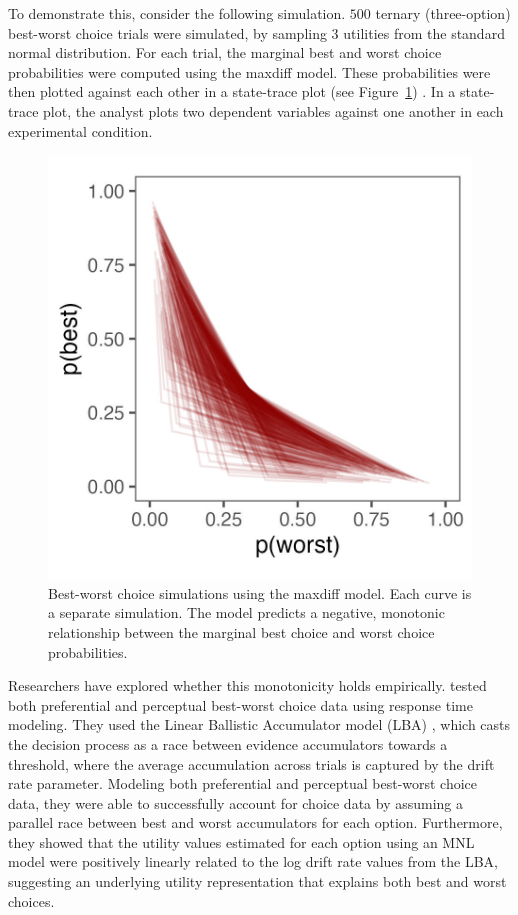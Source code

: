 To demonstrate this, consider the following simulation. $500$ ternary (three-option) best-worst choice trials were simulated, by sampling 3 utilities from the standard normal distribution. For each trial, the marginal best and worst choice probabilities were computed using the maxdiff model. These probabilities were then plotted against each other in a state-trace plot (see Figure~\ref{fig:maxdiff_sim}) \parencite{bamber1979state}. In a state-trace plot, the analyst plots two dependent variables against one another in each experimental condition. 

\begin{figure}
   \centering
   \includegraphics[width=150mm]{figures/maxdiff_sim_monotonic.jpeg}
   \caption{Best-worst choice simulations using the maxdiff model. Each curve is a separate simulation. The model predicts a negative, monotonic relationship between the marginal best choice and worst choice probabilities.}
   \label{fig:maxdiff_sim}
\end{figure}

Researchers have explored whether this monotonicity holds empirically. \textcite{hawkinsIntegratingCognitiveProcess2014a} tested both preferential and perceptual best-worst choice data using response time modeling. They used the Linear Ballistic Accumulator model (LBA) \parencite{brownSimplestCompleteModel2008b}, which casts the decision process as a race between evidence accumulators towards a threshold, where the average accumulation across trials is captured by the drift rate parameter. Modeling both preferential and perceptual best-worst choice data, they were able to successfully account for choice data by assuming a parallel race between best and worst accumulators for each option. Furthermore, they showed that the utility values estimated for each option using an MNL model were positively linearly related to the log drift rate values from the LBA, suggesting an underlying utility representation that explains both best and worst choices. 

